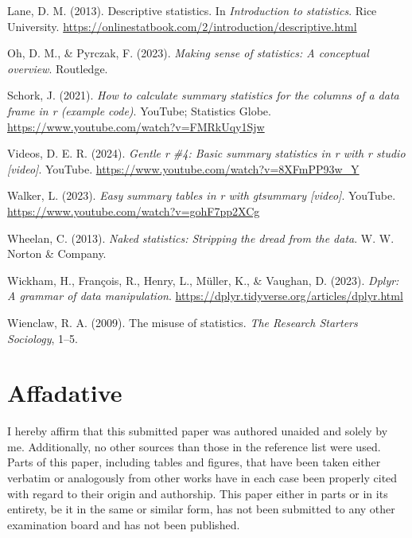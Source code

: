 \documentclass[
  man,
  floatsintext,
  longtable,
  nolmodern,
  notxfonts,
  notimes,
  colorlinks=true,linkcolor=blue,citecolor=blue,urlcolor=blue]{apa7}
\newlength{\cslhangindent}
\newenvironment{CSLReferences}[2] %
 {\begin{list}{}{%
  \setlength{\itemindent}{0pt}
  \setlength{\leftmargin}{0pt}
  \setlength{\parsep}{0pt}
  \ifodd #1
   \setlength{\leftmargin}{\cslhangindent}
   \setlength{\itemindent}{-1\cslhangindent}
  \fi
  \setlength{\itemsep}{#2\baselineskip}}}
 {\end{list}}
\begin{document}
\label{refs}
\begin{CSLReferences}{1}{0}
Lane, D. M. (2013). Descriptive statistics. In \emph{Introduction to
statistics}. Rice University.
\url{https://onlinestatbook.com/2/introduction/descriptive.html}

Oh, D. M., \& Pyrczak, F. (2023). \emph{Making sense of statistics: A
conceptual overview}. Routledge.

Schork, J. (2021). \emph{How to calculate summary statistics for the
columns of a data frame in r (example code)}. YouTube; Statistics Globe.
\url{https://www.youtube.com/watch?v=FMRkUqy1Sjw}

Videos, D. E. R. (2024). \emph{Gentle r \#4: Basic summary statistics in
r with r studio {[}video{]}}. YouTube.
\url{https://www.youtube.com/watch?v=8XFmPP93w_Y}

Walker, L. (2023). \emph{Easy summary tables in r with gtsummary
{[}video{]}}. YouTube. \url{https://www.youtube.com/watch?v=gohF7pp2XCg}

Wheelan, C. (2013). \emph{Naked statistics: Stripping the dread from the
data}. W. W. Norton \& Company.

Wickham, H., François, R., Henry, L., Müller, K., \& Vaughan, D. (2023).
\emph{Dplyr: A grammar of data manipulation}.
\url{https://dplyr.tidyverse.org/articles/dplyr.html}

Wienclaw, R. A. (2009). The misuse of statistics. \emph{The Research
Starters Sociology}, 1--5.

\end{CSLReferences}

\newpage

\section{Affadative}\label{affadative}

I hereby affirm that this submitted paper was authored unaided and
solely by me. Additionally, no other sources than those in the reference
list were used. Parts of this paper, including tables and figures, that
have been taken either verbatim or analogously from other works have in
each case been properly cited with regard to their origin and
authorship. This paper either in parts or in its entirety, be it in the
same or similar form, has not been submitted to any other examination
board and has not been published.
\end{document}
